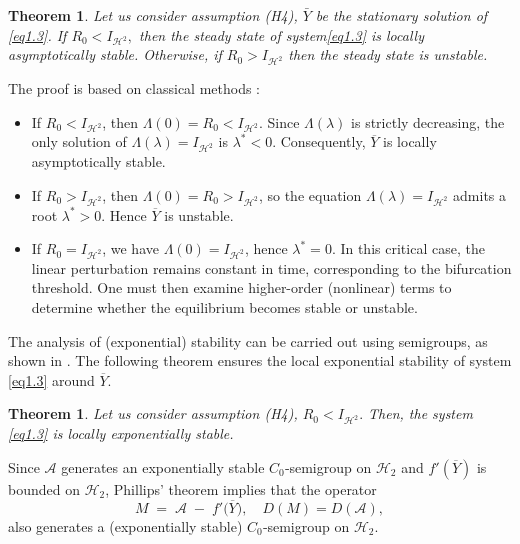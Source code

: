 \documentclass[10pt, a4paper]{amsart}
\makeatletter
\newcounter{assu}
\theoremstyle{plain}
\newtheorem{theorem}[lemma]{Theorem}
\theoremstyle{definition}
\theoremstyle{remark}
\renewenvironment{proof}[1][\proofname]{\par
  \pushQED{\qed}%
  \normalfont \topsep6\p@\@plus6\p@\relax
  \trivlist
  \item[\hskip\labelsep
        \itshape
    #1\ \ref{#1}.]\ignorespaces
}{%
  \popQED\endtrivlist\@endpefalse
}
\numberwithin{equation}{section}
\makeatother
\begin{document}
\begin{theorem}\label{th2.9}
Let us consider assumption (H4),  $\bar Y$  be the stationary solution of \eqref{eq1.3}. If $R_0<I_{\mathcal{H}^2},$ then the steady state of system\eqref{eq1.3} is locally asymptotically stable. Otherwise, if $R_0>I_{\mathcal{H}^2}$ then the steady state is unstable.
\end{theorem}
\begin{proof}[of Theorem \ref{th2.9}]
The proof is based on classical methods : 
\begin{itemize}
\item  If $R_{0} < I_{\mathcal{H}^2}$, then $\Lambda(0) = R_{0} < I_{\mathcal{H}^2}$. Since $\Lambda(\lambda)$ is strictly decreasing, the only solution of $\Lambda(\lambda)=I_{\mathcal{H}^2}$ is $\lambda^{*}<0$. Consequently, $\overline{Y}$ is locally asymptotically stable.

\item  If $R_{0} > I_{\mathcal{H}^2}$, then $\Lambda(0) = R_{0} > I_{\mathcal{H}^2}$, so the equation $\Lambda(\lambda)=I_{\mathcal{H}^2}$ admits a root $\lambda^{*}>0$. Hence $\overline{Y}$ is unstable.

\item  If $R_{0} = I_{\mathcal{H}^2}$, we have $\Lambda(0) = I_{\mathcal{H}^2}$, hence $\lambda^{*}=0$. In this critical case, the linear perturbation remains constant in time, corresponding to the bifurcation threshold. One must then examine higher-order (nonlinear) terms to determine whether the equilibrium becomes stable or unstable.
\end{itemize}
\end{proof}

The analysis of (exponential) stability can be carried out using semigroups, as shown in  \cite{ref63}. The following theorem ensures the local exponential stability of system \eqref{eq1.3} around $\overline{Y}$.

\begin{theorem} \label{th2.10}
Let us consider assumption (H4), $R_0<I_{\mathcal{H}^2}.$ Then, the system \eqref{eq1.3} is locally exponentially stable.
\end{theorem}

\begin{proof}[of Theorem \ref{th2.10}]
Since $\mathcal{A}$ generates an exponentially stable $C_{0}$‐semigroup on $\mathcal{H}_{2}$ and $f'(\overline{Y})$ is bounded on $\mathcal{H}_{2}$, Phillips’ theorem \cite{ref37} implies that the operator
 $$
 M \;=\; \mathcal{A} \;-\; f'\bigl(\overline{Y}\bigr),
 \quad D(M)=D(\mathcal{A}),
 $$
 also generates a (exponentially stable) $C_{0}$‐semigroup on $\mathcal{H}_{2}$.
\end{proof}
\end{document}
